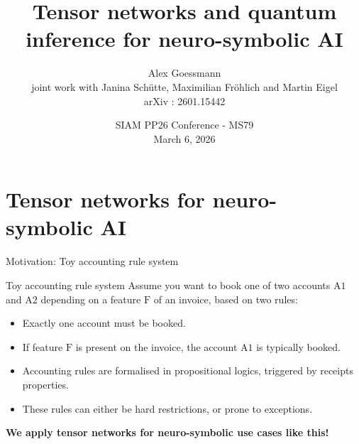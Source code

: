 \documentclass{beamer}
\title[Tensor networks and quantum inference for neuro-symbolic AI]{
    Tensor networks and quantum inference for neuro-symbolic AI
}
\date[March 6, 2026]{SIAM PP26 Conference - MS79\\ March 6, 2026}
\author[A.~Goessmann]{Alex Goessmann \\ joint work with Janina Schütte, Maximilian Fröhlich and Martin Eigel \\
arXiv : 2601.15442}
\institute[WIAS]{
    Weierstraß Institute for Applied Analysis and Stochastics (WIAS)
}
\begin{document}
{\frame[plain]{\titlepage}}


    \addtocounter{framenumber}{-1}


    \section{Tensor networks for neuro-symbolic AI}

    \begin{frame}{Motivation: Toy accounting rule system}

        \begin{block}{Toy accounting rule system}
            Assume you want to book one of two accounts $\mathrm{A1}$ and $\mathrm{A2}$ depending on a feature $\mathrm{F}$ of an invoice, based on two rules:
            \begin{itemize}
                \item \textcolor{\concolor}{Exactly one account must be booked.}
                \item \textcolor{\probcolor}{If feature $\mathrm{F}$ is present on the invoice, the account $\mathrm{A1}$ is typically booked.}
            \end{itemize}
        \end{block}

        \begin{itemize}
            \item {Accounting rules} are formalised in propositional logics, triggered by receipts properties.
            \item These rules can either be \textcolor{\concolor}{hard restrictions}, or \textcolor{\probcolor}{prone to exceptions}.
        \end{itemize}

        \begin{center}
            \bf We apply tensor networks for neuro-symbolic use cases like this!
        \end{center}

    \end{frame}
\end{document}
